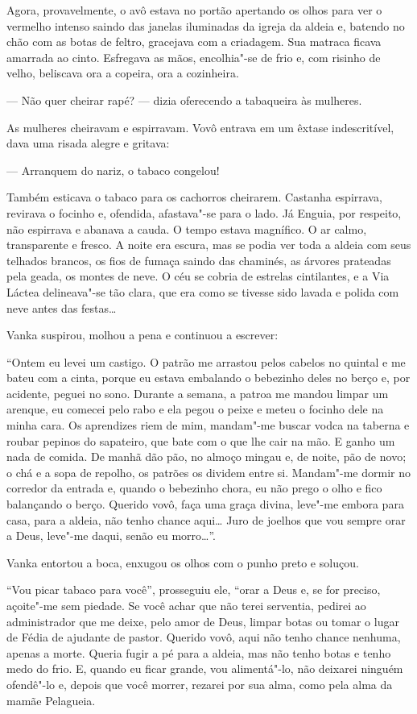 Agora, provavelmente, o avô estava no portão apertando os olhos para ver
o vermelho intenso saindo das janelas iluminadas da igreja da aldeia
e, batendo no chão com as botas de feltro, gracejava com a criadagem.
Sua matraca ficava amarrada ao cinto. Esfregava as mãos, encolhia"-se de
frio e, com risinho de velho, beliscava ora a copeira, ora a cozinheira.

--- Não quer cheirar rapé? --- dizia oferecendo a tabaqueira às
mulheres.

As mulheres cheiravam e espirravam. Vovô entrava em um êxtase
indescritível, dava uma risada alegre e gritava:

--- Arranquem do nariz, o tabaco congelou!

Também esticava o tabaco para os cachorros cheirarem. Castanha
espirrava, revirava o focinho e, ofendida, afastava"-se para o lado. Já
Enguia, por respeito, não espirrava e abanava a cauda. O tempo estava
magnífico. O ar calmo, transparente e fresco. A noite era escura, mas se
podia ver toda a aldeia com seus telhados brancos, os fios de fumaça
saindo das chaminés, as árvores prateadas pela geada, os montes de neve.
O céu se cobria de estrelas cintilantes, e a Via Láctea delineava"-se tão
clara, que era como se tivesse sido lavada e polida com neve antes das
festas\ldots{}

Vanka suspirou, molhou a pena e continuou a escrever:

``Ontem eu levei um castigo. O patrão me arrastou pelos cabelos no
quintal e me bateu com a cinta, porque eu estava embalando o bebezinho
deles no berço e, por acidente, peguei no sono. Durante a semana, a
patroa me mandou limpar um arenque, eu comecei pelo rabo e ela pegou o
peixe e meteu o focinho dele na minha cara. Os aprendizes riem de mim,
mandam"-me buscar vodca na taberna e roubar pepinos do sapateiro, que
bate com o que lhe cair na mão. E ganho um nada de comida. De manhã dão
pão, no almoço mingau e, de noite, pão de novo; o chá e a sopa de
repolho, os patrões os dividem entre si. Mandam"-me dormir no corredor da
entrada e, quando o bebezinho chora, eu não prego o olho e fico
balançando o berço. Querido vovô, faça uma graça divina, leve"-me embora
para casa, para a aldeia, não tenho chance aqui\ldots{} Juro de joelhos que
vou sempre orar a Deus, leve"-me daqui, senão eu morro\ldots{}''.

Vanka entortou a boca, enxugou os olhos com o punho preto e soluçou.

``Vou picar tabaco para você'', prosseguiu ele, ``orar a Deus e, se for
preciso, açoite"-me sem piedade. Se você achar que não terei serventia,
pedirei ao administrador que me deixe, pelo amor de Deus, limpar botas
ou tomar o lugar de Fédia de ajudante de pastor. Querido vovô, aqui não
tenho chance nenhuma, apenas a morte. Queria fugir a pé para a aldeia,
mas não tenho botas e tenho medo do frio. E, quando eu ficar grande, vou
alimentá"-lo, não deixarei ninguém ofendê"-lo e, depois que você morrer,
rezarei por sua alma, como pela alma da mamãe Pelagueia.

